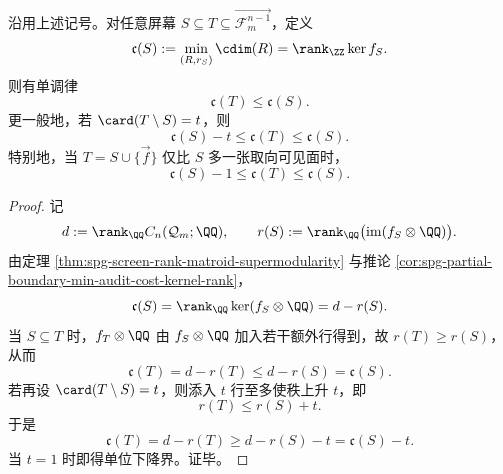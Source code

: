 \begin{corollary}[审计补全成本的单调律与单位下降界]\label{cor:spg-screen-audit-cost-monotone-unit-drop}
沿用上述记号。对任意屏幕 \(S\subseteq T\subseteq \overrightarrow{\mathcal F_m^{n-1}}\)，定义
\[
\mathfrak c(S):=\min_{(R,r_S)}\cdim(R)=\rank_{\ZZ}\ker f_S.
\]
则有单调律
\[
\mathfrak c(T)\le \mathfrak c(S).
\]
更一般地，若 \(\card(T\setminus S)=t\)，则
\[
\mathfrak c(S)-t\le \mathfrak c(T)\le \mathfrak c(S).
\]
特别地，当 \(T=S\cup\{\vec f\}\) 仅比 \(S\) 多一张取向可见面时，
\[
\mathfrak c(S)-1\le \mathfrak c(T)\le \mathfrak c(S).
\]
\end{corollary}
\begin{proof}
记
\[
d:=\rank_{\QQ}C_n(\mathcal Q_m;\QQ),
\qquad
r(S):=\rank_{\QQ}\bigl(\operatorname{im}(f_S\otimes\QQ)\bigr).
\]
由定理 \ref{thm:spg-screen-rank-matroid-supermodularity} 与推论 \ref{cor:spg-partial-boundary-min-audit-cost-kernel-rank}，
\[
\mathfrak c(S)=\rank_{\QQ}\ker(f_S\otimes\QQ)=d-r(S).
\]
当 \(S\subseteq T\) 时，\(f_T\otimes\QQ\) 由 \(f_S\otimes\QQ\) 加入若干额外行得到，故 \(r(T)\ge r(S)\)，从而
\[
\mathfrak c(T)=d-r(T)\le d-r(S)=\mathfrak c(S).
\]
若再设 \(\card(T\setminus S)=t\)，则添入 \(t\) 行至多使秩上升 \(t\)，即
\[
r(T)\le r(S)+t.
\]
于是
\[
\mathfrak c(T)=d-r(T)\ge d-r(S)-t=\mathfrak c(S)-t.
\]
当 \(t=1\) 时即得单位下降界。证毕。
\end{proof}



